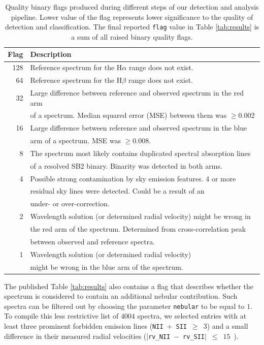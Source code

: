 \begin{table}
	\centering
	\caption{Quality binary flags produced during different steps of our detection and analysis pipeline. Lower value of the flag represents lower significance to the quality of detection and classification. The final reported \texttt{flag} value in Table \ref{tab:results} is a sum of all raised binary quality flags.}
	\label{tab:flags}
	\begin{tabular}{r l}
		\hline
		Flag & Description \\
		\hline \hline
		128 & Reference spectrum for the H$\alpha$ range does not exist.\\
		64 & Reference spectrum for the H$\beta$ range does not exist.\\
		32 & Large difference between reference and observed spectrum in the red arm\\
		   & of a spectrum. Median squared error (MSE) between them was $\ge 0.002$\\
		16 & Large difference between reference and observed spectrum in the blue \\
		   & arm of a spectrum. MSE was $\ge 0.008$.\\
		8 & The spectrum most likely contains duplicated spectral absorption lines \\
		  & of a resolved SB2 binary. Binarity was detected in both arms.\\
		4 & Possible strong contamination by sky emission features. 4 or more \\
		  & residual sky lines were detected. Could be a result of an \\
		  & under- or over-correction.\\
		2 & Wavelength solution (or determined radial velocity) might be wrong in \\
		  & the red arm of the spectrum. Determined from cross-correlation peak \\
		  & between observed and reference spectra.\\
		1 & Wavelength solution (or determined radial velocity)\\
		  & might be wrong in the blue arm of the spectrum.\\
		\hline
	\end{tabular}
\end{table}

The published Table \ref{tab:results} also contains a flag that describes whether the spectrum is considered to contain an additional nebular contribution. Such spectra can be filtered out by choosing the parameter \texttt{nebular} to be equal to $1$. To compile this less restrictive list of $4004$ spectra, we selected entries with at least three prominent forbidden emission lines (\texttt{NII}~$+$~\texttt{SII}~$\ge$~$3$) and a small difference in their measured radial velocities ($|$\texttt{rv\_NII}~$-$~\texttt{rv\_SII}$|$~$\le$~$15$~\kms).

